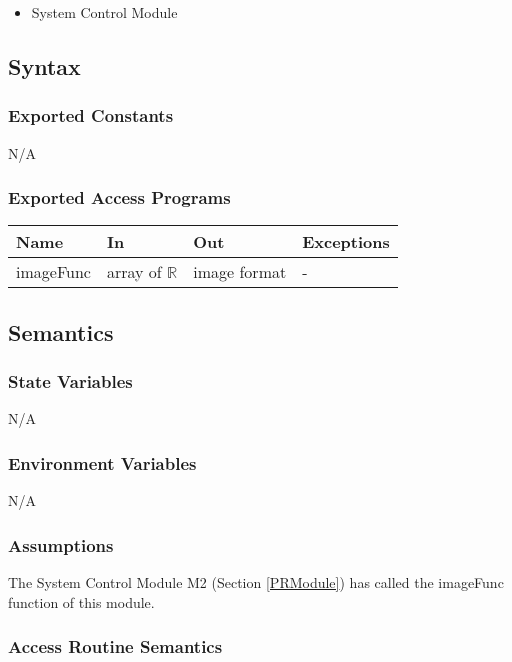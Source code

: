 \documentclass[12pt, titlepage]{article}
\begin{document}
\begin{itemize}
	\item System Control Module
\end{itemize}

\subsection{Syntax}

\subsubsection{Exported Constants}
N/A

\subsubsection{Exported Access Programs}

\begin{center}
	\begin{tabular}{p{2cm} p{4cm} p{4cm} p{2cm}}
		\hline
		\textbf{Name} & \textbf{In} & \textbf{Out} & \textbf{Exceptions} \\
		\hline
		imageFunc & array of $\mathbb{R}$ & image format & - \\
		\hline
	\end{tabular}
\end{center}

\subsection{Semantics}

\subsubsection{State Variables}
N/A

\subsubsection{Environment Variables}
N/A

\subsubsection{Assumptions}

The System Control Module M2 (Section \ref{PRModule}) has called the imageFunc function of this module.

\subsubsection{Access Routine Semantics}
\end{document}
